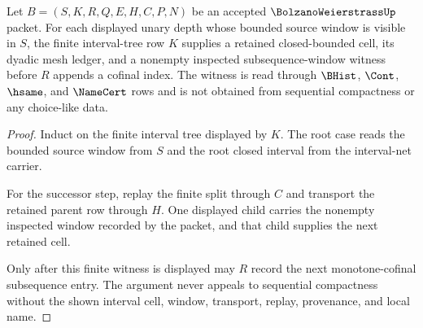 \begin{theorem}
\label{thm:bolzano-weierstrass-interval-depth-witness}
Let $B=(S,K,R,Q,E,H,C,P,N)$ be an accepted $\BolzanoWeierstrassUp$ packet. For each displayed unary depth whose bounded source window is visible in $S$, the finite interval-tree row $K$ supplies a retained closed-bounded cell, its dyadic mesh ledger, and a nonempty inspected subsequence-window witness before $R$ appends a cofinal index. The witness is read through $\BHist$, $\Cont$, $\hsame$, and $\NameCert$ rows and is not obtained from sequential compactness or any choice-like data.
\end{theorem}
\begin{proof}
Induct on the finite interval tree displayed by $K$. The root case reads the bounded source window from $S$ and the root closed interval from the interval-net carrier.

For the successor step, replay the finite split through $C$ and transport the retained parent row through $H$. One displayed child carries the nonempty inspected window recorded by the packet, and that child supplies the next retained cell.

Only after this finite witness is displayed may $R$ record the next monotone-cofinal subsequence entry. The argument never appeals to sequential compactness without the shown interval cell, window, transport, replay, provenance, and local name.
\end{proof}

